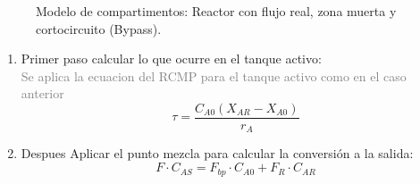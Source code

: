 \begin{enumerate}[label=\alph*)]
\begin{center}
\begin{figure}[htbp]
\begin{tikzpicture}
			      \end{tikzpicture}
			      \caption{Modelo de compartimentos: Reactor con flujo real, zona muerta y cortocircuito (Bypass).}
			      \label{fig:modelo_mezclado_junio_2020}
		      \end{figure}
	      \end{center}
	      \begin{enumerate}
		      \item Primer paso calcular lo que ocurre en el tanque activo: \\
		            {\scriptsize \textcolor{gray}{Se aplica la ecuacion del RCMP para el tanque activo como en el caso anterior}}
		            \begin{equation*}
			            \tau =\frac{C_{A0}(X_{AR}-X_{A0})}{r_A}
		            \end{equation*}
		            \begin{center}
		            \end{center}
		      \item Despues Aplicar el punto mezcla para calcular la conversión a la salida:
		            \begin{equation*}
			            F \cdot C_{AS} = F_{bp}\cdot C_{A0} + F_R\cdot C_{AR}
		            \end{equation*}
		            \begin{center}
\end{center}
\end{enumerate}
\end{enumerate}
